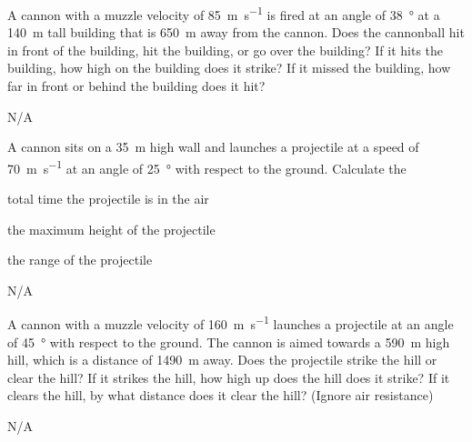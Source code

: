 \begin{question}[ID=upwardly-B-Q01,topic=projectiles,difficulty=B]
    A cannon with a muzzle velocity of \SI{85}{\meter\per\second}
        is fired at an angle of \SI{38}{\degree} at a
        \SI{140}{\meter} tall building that is
        \SI{650}{\meter} away from the cannon.
    Does the cannonball hit in front of the building,
        hit the building, or go over the building?
    If it hits the building, how high on the building does it
        strike?
    If it missed the building, how far in front or behind the
        building does it hit?
\end{question}
\begin{solution}
    N/A
\end{solution}


\begin{question}[ID=upwardly-B-Q02,topic=projectiles,difficulty=B]
    A cannon sits on a \SI{35}{\meter} high wall and
        launches a projectile at a speed of
        \SI{70}{\meter\per\second} at an angle of
        \SI{25}{\degree} with respect to the ground.
    Calculate the
    \begin{enumerate*}[label=\arabic*)]
        \item total time the projectile is in the air
        \item the maximum height of the projectile
        \item the range of the projectile
    \end{enumerate*}
\end{question}
\begin{solution}
    N/A
\end{solution}


\begin{question}[ID=upwardly-B-Q03,topic=projectiles,difficulty=B]
    A cannon with a muzzle velocity of \SI{160}{\meter\per\second}
        launches a projectile at an angle of \SI{45}{\degree}
        with respect to the ground.
    The cannon is aimed towards a \SI{590}{\meter} high hill,
        which is a distance of \SI{1490}{\meter} away.
    Does the projectile strike the hill or clear the hill?
    If it strikes the hill, how high up does the hill does it
        strike?
    If it clears the hill, by what distance does it clear the hill?
    (Ignore air resistance)
\end{question}
\begin{solution}
    N/A
\end{solution}


